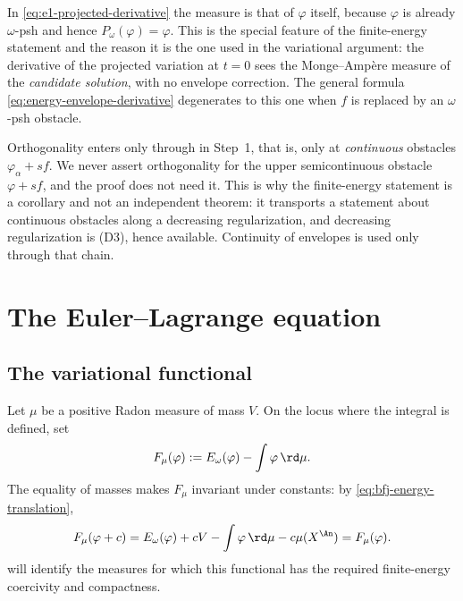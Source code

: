 \begin{remark}
\label{rem:ch27-e1-derivative-measure}
In \eqref{eq:e1-projected-derivative} the measure is that of $\varphi$
itself, because $\varphi$ is already $\omega$-psh and hence
$P_\omega(\varphi)=\varphi$.  This is the special feature of the
finite-energy statement and the reason it is the one used in the variational
argument: the derivative of the projected variation at $t=0$ sees the
Monge--Amp\`ere measure of the \emph{candidate solution}, with no envelope
correction.  The general formula \eqref{eq:energy-envelope-derivative}
degenerates to this one when $f$ is replaced by an $\omega$-psh
obstacle.
\end{remark}

\begin{remark}
\label{rem:ch27-e1-hypotheses}
Orthogonality enters  only through
 in Step~1, that is, only at
\emph{continuous} obstacles $\varphi_\alpha+sf$.  We never assert
orthogonality for the upper semicontinuous obstacle $\varphi+sf$, and the
proof does not need it.  This is why the finite-energy statement is a
corollary and not an independent theorem: it transports a statement about
continuous obstacles along a decreasing regularization, and decreasing
regularization is \textup{(D3)}, hence available.  Continuity of envelopes is
used only through that chain.
\end{remark}

\section{The Euler--Lagrange equation}
\label{sec:ch27-euler-lagrange}

\subsection{The variational functional}
\label{sec:ch27-variational-functional}

Let $\mu$ be a positive Radon measure of mass $V$. On the locus where the
integral is defined, set
\begin{equation}\label{eq:bfj-variational-functional}
                  F_\mu(\varphi)
                  :=E_\omega(\varphi)-\int\varphi\,\rd \mu.
\end{equation}
The equality of masses makes $F_\mu$ invariant under constants: by
\eqref{eq:bfj-energy-translation},
\[
 F_\mu(\varphi+c)=E_\omega(\varphi)+cV-\int\varphi\,\rd\mu-c\mu(X^{\An})
 =F_\mu(\varphi).
\]
will identify the measures for which this functional has the required
finite-energy coercivity and compactness.

